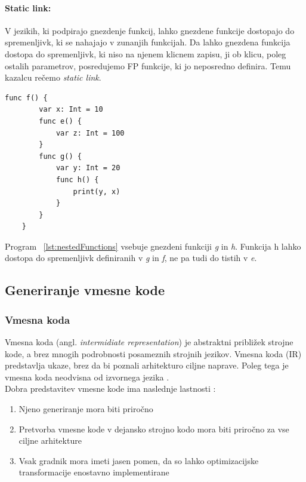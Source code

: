 \documentclass[a4paper, 12p]{book}
\begin{document}
\paragraph{Static link:}

V jezikih, ki podpirajo gnezdenje funkcij, lahko gnezdene funkcije dostopajo do spremenljivk, ki se nahajajo v zunanjih funkcijah. Da lahko gnezdena funkcija dostopa do spremenljivk, ki niso na njenem klicnem zapisu, ji ob klicu, poleg ostalih parametrov, posredujemo FP funkcije, ki jo neposredno definira. Temu kazalcu rečemo \textit{static link}. 

\renewcommand{\lstlistingname}{Program}
\begin{lstlisting}[caption={Primer gnezdenih funkcij.}, captionpos=b, label={lst:nestedFunctions}]
    func f() {
        var x: Int = 10
        func e() {
            var z: Int = 100
        }
        func g() {
            var y: Int = 20
            func h() {
                print(y, x)
            }
        }
    }
\end{lstlisting}

Program ~\ref{lst:nestedFunctions} vsebuje gnezdeni funkciji \textit{g} in \textit{h}. Funkcija h lahko dostopa do spremenljivk definiranih v \textit{g} in \textit{f}, ne pa tudi do tistih v \textit{e}.

\subsection{Generiranje vmesne kode}   

\subsubsection{Vmesna koda}

Vmesna koda (angl. \textit{intermidiate representation}) je abstraktni približek strojne kode, a brez mnogih podrobnosti posameznih strojnih jezikov. Vmesna koda (IR) predstavlja ukaze, brez da bi poznali arhitekturo ciljne naprave. Poleg tega je vmesna koda neodvisna od izvornega jezika \cite{modernCompiler}. \\
\indent Dobra predstavitev vmesne kode ima naslednje lastnosti \cite{modernCompiler}:

\begin{enumerate}
	\item Njeno generiranje mora biti priročno
	\item Pretvorba vmesne kode v dejansko strojno kodo mora biti priročno za vse ciljne arhitekture
	\item Vsak gradnik mora imeti jasen pomen, da so lahko optimizacijske transformacije enostavno implementirane
\end{enumerate}
\end{document}
